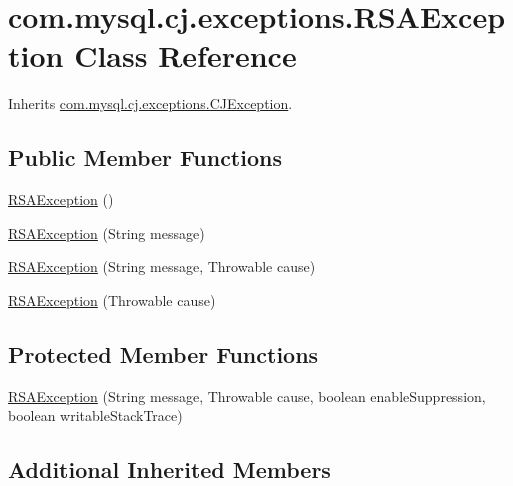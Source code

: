\hypertarget{classcom_1_1mysql_1_1cj_1_1exceptions_1_1_r_s_a_exception}{}\section{com.\+mysql.\+cj.\+exceptions.\+R\+S\+A\+Exception Class Reference}
\label{classcom_1_1mysql_1_1cj_1_1exceptions_1_1_r_s_a_exception}


Inherits \mbox{\hyperlink{classcom_1_1mysql_1_1cj_1_1exceptions_1_1_c_j_exception}{com.\+mysql.\+cj.\+exceptions.\+C\+J\+Exception}}.

\subsection*{Public Member Functions}
\begin{DoxyCompactItemize}
\item 
\mbox{\hyperlink{classcom_1_1mysql_1_1cj_1_1exceptions_1_1_r_s_a_exception_aa9a0893dfb593cb7cd9971651b111208}{R\+S\+A\+Exception}} ()
\item 
\mbox{\hyperlink{classcom_1_1mysql_1_1cj_1_1exceptions_1_1_r_s_a_exception_ae7cb98716a5af515d8a9d8f6fc00fb1a}{R\+S\+A\+Exception}} (String message)
\item 
\mbox{\hyperlink{classcom_1_1mysql_1_1cj_1_1exceptions_1_1_r_s_a_exception_a7d89760310f75054b72b507271a44fb3}{R\+S\+A\+Exception}} (String message, Throwable cause)
\item 
\mbox{\hyperlink{classcom_1_1mysql_1_1cj_1_1exceptions_1_1_r_s_a_exception_ac627e001f7ede81a3a999276fdbec558}{R\+S\+A\+Exception}} (Throwable cause)
\end{DoxyCompactItemize}
\subsection*{Protected Member Functions}
\begin{DoxyCompactItemize}
\item 
\mbox{\hyperlink{classcom_1_1mysql_1_1cj_1_1exceptions_1_1_r_s_a_exception_a5d442d55f6d35b5e22036dca219f751a}{R\+S\+A\+Exception}} (String message, Throwable cause, boolean enable\+Suppression, boolean writable\+Stack\+Trace)
\end{DoxyCompactItemize}
\subsection*{Additional Inherited Members}


